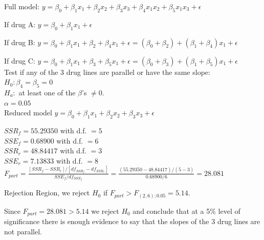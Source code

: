 \documentclass{article}
\begin{document}
\begin{enumerate}[1.]
Full model: $y = \beta_0 + \beta_1x_1 + \beta_2x_2 + \beta_3x_3 + \beta_4x_1x_2 + \beta_5x_1x_3 + \epsilon$

If drug A: $y = \beta_0 + \beta_1x_1 + \epsilon$

If drug B: $y = \beta_0 + \beta_1x_1 + \beta_2 + \beta_4x_1 + \epsilon = (\beta_0 + \beta_2) + (\beta_1 + \beta_4)x_1 + \epsilon$

If drug C: $y = \beta_0 + \beta_1x_1 + \beta_3 + \beta_5x_1 + \epsilon = (\beta_0 + \beta_3) + (\beta_1 + \beta_5)x_1 + \epsilon$ \\

Test if any of the 3 drug lines are parallel or have the same slope: \\
$H_0: \beta_4 = \beta_5 = 0$ \\
$H_a:$ at least one of the $\beta$'s $\neq 0$. \\
$\alpha = 0.05$ \\

Reduced model $y = \beta_0 + \beta_1x_1 + \beta_2x_2 + \beta_3x_3 + \epsilon$

$SSR_f = 55.29350$ with d.f. $= 5$ \\
$SSE_f = 0.68900$ with d.f. $=6$ \\
$SSR_r = 48.84417$ with d.f. $= 3$ \\
$SSE_r = 7.13833$ with d.f. $= 8$ \\

$F_{part} = \frac{ [SSR_f - SSR_r] / [df_{SSR_f} - df_{SSR_r} ] }{ SSE_f / df_{SSE_f} } = \frac{ (55.29350 - 48.84417)/(5 - 3) }{ 0.68900 / 6} = 28.081$

Rejection Region, we reject $H_0$ if $F_{part} > F_{(2,6); 0.05} = 5.14$.

Since $F_{part} = 28.081 > 5.14$ we reject $H_0$ and conclude that at a 5\% level of significance there is enough evidence to  say that the slopes of the 3 drug lines are not parallel.

\end{enumerate}
\end{document}
